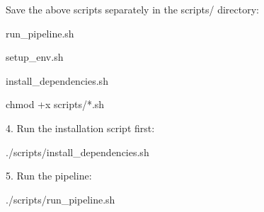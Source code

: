 Save the above scripts separately in the scripts/ directory:

run_pipeline.sh

setup_env.sh

install_dependencies.sh

chmod +x scripts/*.sh


4. Run the installation script first:

./scripts/install_dependencies.sh


5. Run the pipeline:

./scripts/run_pipeline.sh



